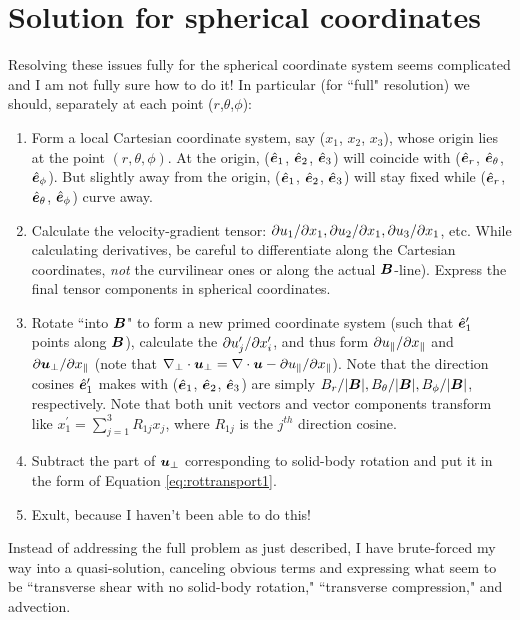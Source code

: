 \documentclass[12pt]{article}
\newcommand{\xpar}{x_\parallel}
\newcommand{\upar}{u_\parallel}
\newcommand{\uperp}{\vecu_\perp}
\begin{document}
\section{Solution for spherical coordinates}
Resolving these issues fully for the spherical coordinate system seems complicated and I am not fully sure how to do it! In particular (for ``full" resolution) we should, separately at each point ($r$,$\theta$,$\phi$):
\begin{enumerate}
	\item Form a local Cartesian coordinate system, say ($x_1$, $x_2$, $x_3$), whose origin lies at the point $(r,\theta,\phi)$. At the origin, ($\hat{\bm{e}}_1$, $\hat{\bm{e}}_2$, $\hat{\bm{e}}_3$) will coincide with ($\hat{\bm{e}}_r$, $\hat{\bm{e}}_\theta$, $\hat{\bm{e}}_\phi$). But slightly away from the origin, ($\hat{\bm{e}}_1$, $\hat{\bm{e}}_2$, $\hat{\bm{e}}_3$) will stay fixed while ($\hat{\bm{e}}_r$, $\hat{\bm{e}}_\theta$, $\hat{\bm{e}}_\phi$) curve away. 
	\item Calculate the velocity-gradient tensor: $\partial u_1/\partial x_1,\partial u_2/\partial x_1, \partial u_3/\partial x_1$, etc. While calculating derivatives, be careful to differentiate along the Cartesian coordinates, \textit{not} the curvilinear ones or along the actual $\bm{B}$-line). Express the final tensor components in spherical coordinates.
	\item Rotate ``into $\bm{B}$" to form a new primed coordinate system (such that $\hat{\bm{e}}_1^\prime$ points along $\bm{B}$), calculate the $\partial u_j^\prime/\partial x_i^\prime$, and thus form $\pderivline{\upar}{\xpar}$ and $\pderivline{\uperp}{\xpar}$ (note that $\nabla_\perp\cdot\uperp=\Div\vecu- \pderivline{\upar}{\xpar}$). Note that the direction cosines $\hat{\bm{e}}_1^\prime$ makes with ($\hat{\bm{e}}_1$, $\hat{\bm{e}}_2$, $\hat{\bm{e}}_3$) are simply $B_r/|\bm{B}|, B_\theta/|\bm{B}|, B_\phi/|\bm{B}|$, respectively. Note that both unit vectors and vector components transform like $x_1^\prime=\sum_{j=1}^3R_{1j}x_j$, where $R_{1j}$ is the $j^{th}$ direction cosine.  
	\item Subtract the part of $\uperp$ corresponding to solid-body rotation and put it in the form of Equation \eqref{eq:rottransport1}. 
	\item Exult, because I haven't been able to do this!
\end{enumerate}
Instead of addressing the full problem as just described, I have brute-forced my way into a quasi-solution, canceling obvious terms and expressing what seem to be ``transverse shear with no solid-body rotation," ``transverse compression," and advection. 
\end{document}
